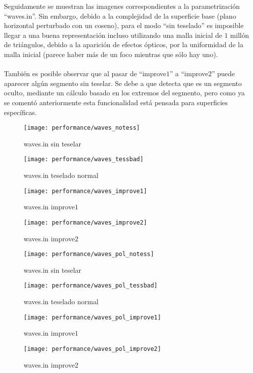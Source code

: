 	Seguidamente se muestran las imagenes correspondientes a la parametrización ``waves.in''. Sin embargo, debido a la complejidad de la superficie base (plano horizontal perturbado con un coseno), para el modo ``sin teselado'' es imposible llegar a una buena representación incluso utilizando una malla inicial de $1$ millón de triángulos, debido a la aparición de efectos ópticos, por la uniformidad de la malla inicial (parece haber más de un foco mientras que sólo hay uno).\\
	\\También es posible observar que al pasar de ``improve$1$'' a ``improve$2$'' puede aparecer algún segmento sin teselar. Se debe a que detecta que es un segmento oculto, mediante un cálculo basado en los extremos del segmento, pero como ya se comentó anteriormente esta funcionalidad está pensada para superficies específicas.
	\newpage
	\begin{figure}[h]
  		\centering
  		\texttt{[image: performance/waves\_notess]}
  		\caption{waves.in sin teselar}
  		\vspace{0.5cm}
  		\texttt{[image: performance/waves\_tessbad]}
  		\caption{waves.in teselado normal}
  		\vspace{0.5cm}
  		\texttt{[image: performance/waves\_improve1]}
  		\caption{waves.in improve$1$}
  		\vspace{0.5cm}
  		\texttt{[image: performance/waves\_improve2]}
  		\caption{waves.in improve$2$}
  		\label{fig:imagenes_waves}
	\end{figure}	
	\begin{figure}[h]
  		\centering
  		\texttt{[image: performance/waves\_pol\_notess]}
  		\caption{waves.in sin teselar}
  		\vspace{0.5cm}
  		\texttt{[image: performance/waves\_pol\_tessbad]}
  		\caption{waves.in teselado normal}
  		\vspace{0.5cm}
  		\texttt{[image: performance/waves\_pol\_improve1]}
  		\caption{waves.in improve$1$}
  		\vspace{0.5cm}
  		\texttt{[image: performance/waves\_pol\_improve2]}
  		\caption{waves.in improve$2$}
  		\label{fig:imagenes_waves_pol}
	\end{figure}	
	\newpage
		
		
\endinput
